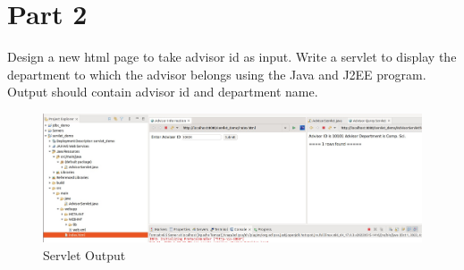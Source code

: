 \documentclass{article}
\begin{document}
\section{Part 2}
Design a new html page to take advisor id as input. Write a servlet to display the
department to which the advisor belongs using the Java and J2EE program. Output
should contain advisor id and department name.
\begin{figure}[!ht]
  \begin{center}
  \includegraphics[scale=0.4]{Part_B_1.jpg}
  \caption{Servlet Output}
  \end{center}
\end{figure}
\end{document}
